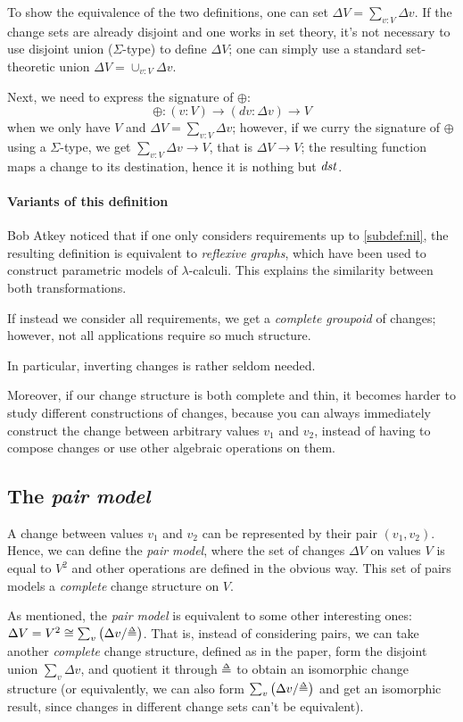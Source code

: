 To show the equivalence of the two definitions, one can set
$\Delta V = \sum_{v: V} \Delta v$. If the change sets are already disjoint and
one works in set theory, it's not necessary to use disjoint union
($\Sigma$-type) to define $\Delta V$; one can simply use a standard
set-theoretic union $\Delta V = \cup_{v: V} \Delta v$.

Next, we need to express the signature of $\oplus$:
\[\oplus: (v: V) → (dv: \Delta v) → V\]
when we only have $V$ and $\Delta V = \sum_{v: V} \Delta v$; however, if we
curry the signature of $\oplus$ using a $\Sigma$-type, we get
$\sum_{v: V} \Delta v → V$, that is $\Delta V → V$; the resulting function maps
a change to its destination, hence it is nothing but $\mathit{dst}$.

\paragraph{Variants of this definition}
Bob Atkey noticed that if one only considers requirements up to
\cref{subdef:nil}, the resulting definition is equivalent to \emph{reflexive
  graphs}, which have been used to construct parametric models of
$\lambda$-calculi. This explains the similarity between both transformations.

If instead we consider all requirements, we get a \emph{complete groupoid} of
changes; however, not all applications require so much structure.

In particular, inverting changes is rather seldom needed.

Moreover, if our change structure is both complete and thin, it becomes harder
to study different constructions of changes, because you can always immediately
construct the change between arbitrary values $v_1$ and $v_2$, instead of having
to compose changes or use other algebraic operations on them.

\subsection{The \emph{pair model}}
A change between values $v_1$ and $v_2$ can be represented by their pair
$(v_1, v_2)$. Hence, we can define the \emph{pair model}, where the set of
changes $\Delta V$ on values $V$ is equal to $V^2$ and other operations are
defined in the obvious way. This set of pairs models a \emph{complete} change
structure on $V$.

As mentioned, the \emph{pair model} is equivalent to some other interesting
ones: $\Delta V = V^2 \cong \sum_v \left(\Delta v / \mathbin{\Doe}\right)$. That is, instead of
considering pairs, we can take another \emph{complete} change structure, defined
as in the paper, form the disjoint union $\sum_v \Delta v$, and quotient it
through $\Doe$ to obtain an isomorphic change structure (or equivalently, we
can also form $\sum_v \left(\Delta v / \mathbin{\Doe}\right)$ and get an isomorphic result, since
changes in different change sets can't be equivalent).

